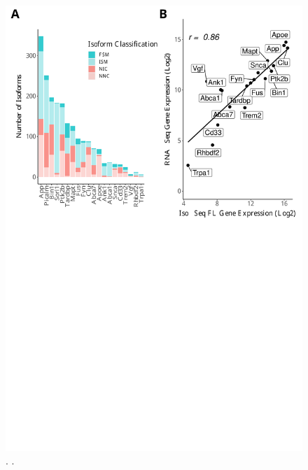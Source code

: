\begin{figure}[!htp]
	\begin{center}
		\includegraphics[page=5,trim={0 0cm 0 0cm},clip,scale = 0.60]{Figures/ONTvsIsoSeq.pdf}
	\end{center}
	\captionsetup{width=0.95\textwidth}
	\caption[]%
	{\textbf{ }. .}
	\label{fig:commonvsunique_description}
\end{figure}
\begin{figure}[t]
	\captionsetup{width=0.95\textwidth}
	\contcaption{}%
\end{figure}


